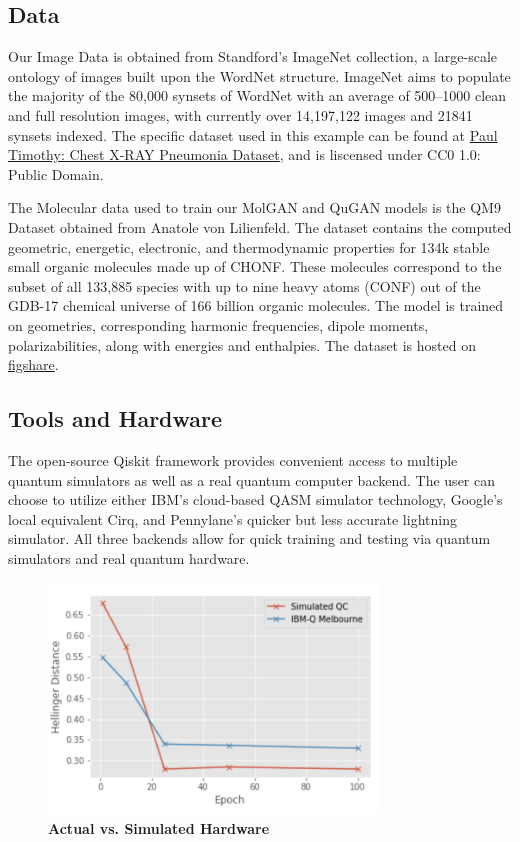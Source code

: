 \documentclass{scrartcl}
\begin{document}
\subsection{Data}
\label{sec:org3b37fd2}

Our Image Data is obtained from Standford's ImageNet collection, a large-scale ontology of images built upon the WordNet structure. ImageNet aims to populate the majority of the 80,000 synsets of WordNet with an average of 500–1000 clean and full resolution images, with currently over 14,197,122 images and 21841 synsets indexed. The specific dataset used in this example can be found at \href{https://www.kaggle.com/paultimothymooney/chest-xray-pneumonia}{Paul Timothy: Chest X-RAY Pneumonia Dataset}, and is liscensed under CC0 1.0: Public Domain.

The Molecular data used to train our MolGAN and QuGAN models is the QM9 Dataset obtained from Anatole von Lilienfeld. The dataset contains the computed geometric, energetic, electronic, and thermodynamic properties for 134k stable small organic molecules made up of CHONF. These molecules correspond to the subset of all 133,885 species with up to nine heavy atoms (CONF) out of the GDB-17 chemical universe of 166 billion organic molecules. The model is trained on geometries, corresponding harmonic frequencies, dipole moments, polarizabilities, along with energies and enthalpies. The dataset is hosted on \href{https://doi.org/10.6084/m9.figshare.c.978904.v5}{figshare}.

\subsection{Tools and Hardware}
\label{sec:org9017251}

The open-source Qiskit framework provides convenient access to multiple quantum simulators as well as a real quantum computer backend. The user can choose to utilize either IBM's cloud-based QASM simulator technology, Google's local equivalent Cirq, and Pennylane's quicker but less accurate lightning simulator. All three backends allow for quick training and testing via quantum simulators and real quantum hardware.

\begin{figure}[htbp]
\centering
\includegraphics[width=250pt]{./assets/simulatedvsreal.png}
\caption{\textbf{Actual vs. Simulated Hardware}}
\end{figure}
\end{document}
